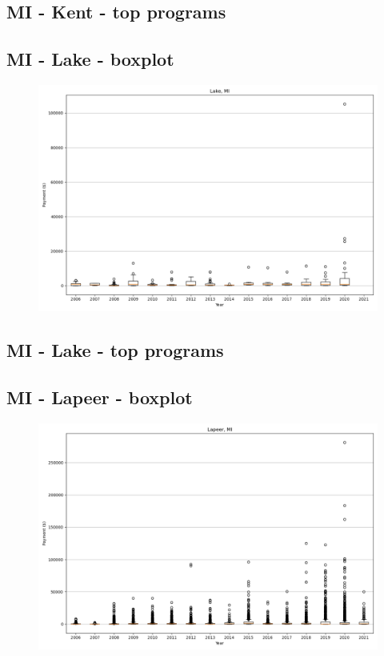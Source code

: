 \subsection*{MI - Kent - top programs}

\newpage
\subsection*{MI - Lake - boxplot}
\begin{figure}[h]
\centering
\includegraphics[width=7in]{../output/boxplots/counties/Lake-MI_boxplot.png}
\end{figure}


\subsection*{MI - Lake - top programs}

\newpage
\subsection*{MI - Lapeer - boxplot}
\begin{figure}[h]
\centering
\includegraphics[width=7in]{../output/boxplots/counties/Lapeer-MI_boxplot.png}
\end{figure}


